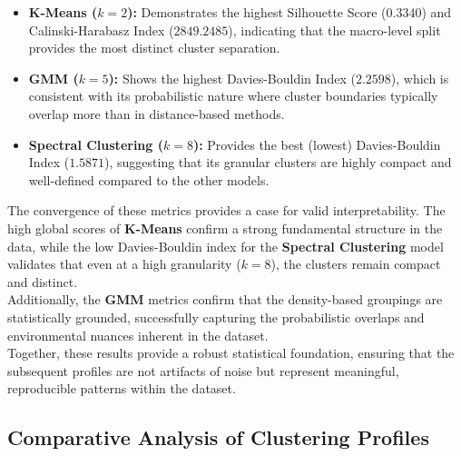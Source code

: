 \documentclass[conference]{IEEEtran}
\begin{document}
\begin{itemize}
	\item \textbf{K-Means ($k=2$):} Demonstrates the highest Silhouette Score ($0.3340$) and Calinski-Harabasz Index ($2849.2485$), indicating that the macro-level split provides the most distinct cluster separation.
	\item \textbf{GMM ($k=5$):} Shows the highest Davies-Bouldin Index ($2.2598$), which is consistent with its probabilistic nature where cluster boundaries typically overlap more than in distance-based methods.
	\item \textbf{Spectral Clustering ($k=8$):} Provides the best (lowest) Davies-Bouldin Index ($1.5871$), suggesting that its granular clusters are highly compact and well-defined compared to the other models.
\end{itemize}

\indent The convergence of these metrics provides a case for valid interpretability. The high global scores of \textbf{K-Means} confirm a strong fundamental structure in the data, while the low Davies-Bouldin index for the \textbf{Spectral Clustering} model validates that even at a high granularity ($k=8$), the clusters remain compact and distinct.\\
\indent Additionally, the \textbf{GMM} metrics confirm that the density-based groupings are statistically grounded, successfully capturing the probabilistic overlaps and environmental nuances inherent in the dataset.\\
\indent Together, these results provide a robust statistical foundation, ensuring that the subsequent profiles are not artifacts of noise but represent meaningful, reproducible patterns within the dataset.

\subsection{\textbf{Comparative Analysis of Clustering Profiles}}
\end{document}

